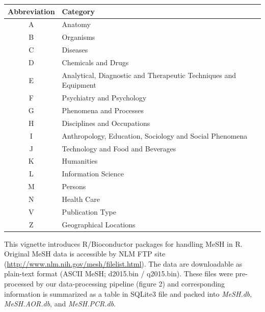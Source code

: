 \documentclass[11pt]{article}
\newcommand{\Rpackage}[1]{{\textit{#1}}}
\begin{document}
\begin{center}
  \begin{table}[htbp]
    \begin{tabular}{|c|l|}\hline
      Abbreviation & Category \\ \hline \hline
      A & Anatomy \\ \hline
      B & Organisms \\ \hline
      C & Diseases \\ \hline
      D & Chemicals and Drugs \\ \hline
      E & Analytical, Diagnostic and Therapeutic Techniques and Equipment \\ \hline
      F & Psychiatry and Psychology \\ \hline
      G & Phenomena and Processes \\ \hline
      H & Disciplines and Occupations \\ \hline
      I & Anthropology, Education, Sociology and Social Phenomena \\ \hline
      J & Technology and Food and Beverages \\ \hline
      K & Humanities \\ \hline
      L & Information Science \\ \hline
      M & Persons \\ \hline
      N & Health Care \\ \hline
      V & Publication Type \\ \hline
      Z & Geographical Locations \\ \hline
\end{tabular}
  \end{table}
\end{center}
This vignette introduces R/Bioconductor packages for handling MeSH in R. Original MeSH data is accessible by NLM FTP site (\url{http://www.nlm.nih.gov/mesh/filelist.html}). The data are downloadable as plain-text format (ASCII MeSH; d2015.bin / q2015.bin). These files were pre-processed by our data-processing pipeline (figure 2) and corresponding information is summarized as a table in SQLite3 file and packed into \Rpackage{MeSH.db}, \Rpackage{MeSH.AOR.db}, and \Rpackage{MeSH.PCR.db}.

\clearpage
\end{document}
